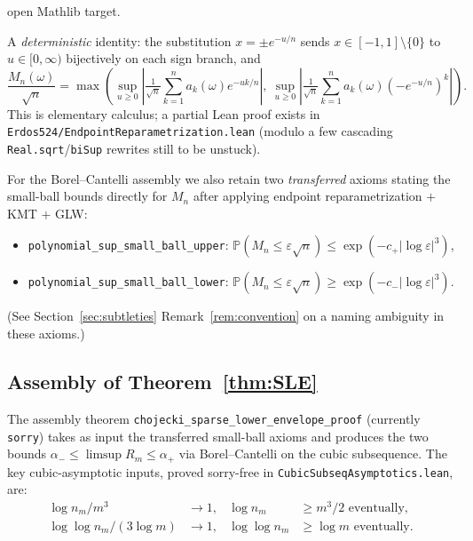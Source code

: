 \documentclass[11pt]{article}
\theoremstyle{plain}
\theoremstyle{definition}
\theoremstyle{remark}
\newcommand{\PP}{\mathbb{P}}
\newcommand{\supnorm}{M}
\newcommand{\eps}{\varepsilon}
\begin{document}
\begin{description}[style=nextline,leftmargin=3cm]
    open Mathlib target.
  \item[\texttt{endpoint\_reparametrization}] A \emph{deterministic}
    identity: the substitution $x = \pm e^{-u/n}$ sends
    $x \in [-1,1]\setminus\{0\}$ to $u\in[0,\infty)$ bijectively on each
    sign branch, and
    \[\frac{\supnorm_n(\omega)}{\sqrt n}
      = \max\!\left(\sup_{u\ge 0}\!\left|\tfrac{1}{\sqrt n}\textstyle\sum_{k=1}^n a_k(\omega)e^{-uk/n}\right|,\
         \sup_{u\ge 0}\!\left|\tfrac{1}{\sqrt n}\textstyle\sum_{k=1}^n a_k(\omega)(-e^{-u/n})^k\right|\right).\]
    This is elementary calculus; a partial Lean proof exists in
    \texttt{Erdos524/EndpointReparametrization.lean} (modulo a few
    cascading \texttt{Real.sqrt}/\texttt{biSup} rewrites still to be
    unstuck).
\end{description}

For the Borel–Cantelli assembly we also retain two \emph{transferred}
axioms stating the small-ball bounds directly for $\supnorm_n$ after
applying endpoint reparametrization $+$ KMT $+$ GLW:
\begin{itemize}
  \item \texttt{polynomial\_sup\_small\_ball\_upper}:
    $\PP(\supnorm_n \le \eps\sqrt n) \le \exp(-c_+|\log\eps|^3)$,
  \item \texttt{polynomial\_sup\_small\_ball\_lower}:
    $\PP(\supnorm_n \le \eps\sqrt n) \ge \exp(-c_-|\log\eps|^3)$.
\end{itemize}
(See Section~\ref{sec:subtleties} Remark~\ref{rem:convention} on a naming
ambiguity in these axioms.)

\subsection{Assembly of Theorem~\ref{thm:SLE}}\label{sec:assembly}

The assembly theorem
\texttt{chojecki\_sparse\_lower\_envelope\_proof} (currently
\texttt{sorry}) takes as input the transferred small-ball axioms and
produces the two bounds $\alpha_- \le \limsup R_m \le \alpha_+$ via
Borel–Cantelli on the cubic subsequence. The key cubic-asymptotic
inputs, proved sorry-free in
\texttt{CubicSubseqAsymptotics.lean}, are:
\begin{align}
  \log n_m / m^3 &\to 1, & \log n_m &\ge m^3/2\text{ eventually},\label{eq:cubic-log}\\
  \log\log n_m / (3\log m) &\to 1, & \log\log n_m &\ge \log m\text{ eventually}.\label{eq:cubic-loglog}
\end{align}
\end{document}
